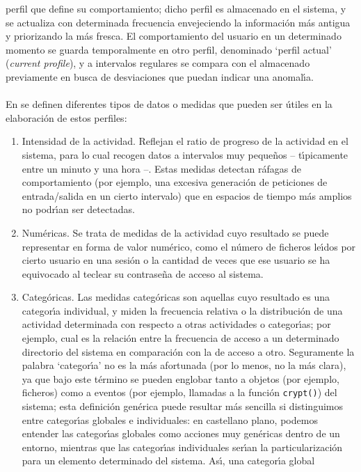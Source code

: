 perfil que define su comportamiento; dicho perfil es almacenado en el sistema,
y se actualiza con determinada frecuencia envejeciendo la informaci\'on m\'as 
antigua y priorizando la m\'as fresca. El comportamiento del usuario en un 
determinado momento se guarda temporalmente en otro perfil, denominado `perfil
actual' ({\it current profile}), y a intervalos regulares se compara con el
almacenado previamente en busca de desviaciones que puedan indicar una 
anomal\'{\i}a.\\
\\En \cite{kn:jv93} se definen diferentes tipos de datos o medidas que pueden
ser \'utiles en la elaboraci\'on de estos perfiles:
\begin{enumerate}
\item Intensidad de la actividad. Reflejan el ratio de progreso de la actividad
en el sistema, para lo cual recogen datos a intervalos muy peque\~nos -- 
t\'{\i}picamente entre un minuto y una hora --. Estas medidas
detectan r\'afagas de comportamiento (por ejemplo, una excesiva generaci\'on de 
peticiones de entrada/salida en un cierto intervalo) que en espacios de tiempo
m\'as amplios no podr\'{\i}an ser detectadas.
\item Num\'ericas. Se trata de medidas de la actividad cuyo resultado se puede
representar en forma de valor num\'erico, como el n\'umero de ficheros 
le\'{\i}dos por cierto usuario en una sesi\'on o la cantidad de veces que ese
usuario se ha equivocado al teclear su contrase\~na de acceso al sistema.
\item Categ\'oricas. Las medidas categ\'oricas son aquellas cuyo resultado es
una categor\'{\i}a individual, y miden la frecuencia relativa o la 
distribuci\'on de una actividad determinada con respecto a otras actividades o
categor\'{\i}as; por ejemplo, cual es la 
relaci\'on entre la frecuencia de acceso a un determinado directorio del 
sistema en comparaci\'on con la de acceso a otro. Seguramente la palabra
`categor\'{\i}a' no es la m\'as afortunada (por lo menos, no la m\'as clara),
ya que bajo este t\'ermino se pueden englobar tanto a objetos (por ejemplo, 
ficheros) como a eventos (por ejemplo, llamadas a la funci\'on {\tt crypt()}) 
del sistema; esta definici\'on gen\'erica puede resultar m\'as sencilla si 
distinguimos entre 
categor\'{\i}as globales e individuales: en castellano plano, podemos entender
las categor\'{\i}as globales como acciones muy gen\'ericas dentro de un entorno,
mientras que las categor\'{\i}as individuales ser\'{\i}an la particularizaci\'on
para un elemento determinado del sistema. As\'{\i}, una categor\'{\i}a global

\end{enumerate}
